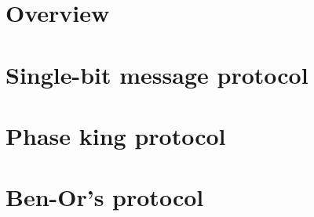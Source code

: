 \section{Overview}


\section{Single-bit message protocol}


\section{Phase king protocol}


\section{Ben-Or's protocol}
